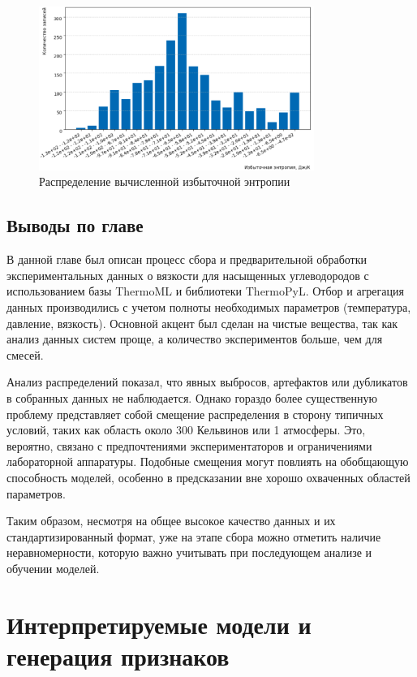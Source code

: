 \documentclass[a4paper,12pt]{article}
\begin{document}
      \begin{figure}[ht!]
          \centering
          \includegraphics[width=0.8\textwidth]{data_distribution_excess_entropy.png}
          \caption{Распределение вычисленной избыточной энтропии}
          \label{fig:data_distribution_excess_entropy}
      \end{figure}
      
  \subsection{Выводы по главе}
    В данной главе был описан процесс сбора и предварительной обработки экспериментальных данных о вязкости для насыщенных углеводородов с использованием базы ThermoML и библиотеки ThermoPyL. Отбор и агрегация данных производились с учетом полноты необходимых параметров (температура, давление, вязкость). Основной акцент был сделан на чистые вещества, так как анализ данных систем проще, а количество экспериментов больше, чем для смесей.

    Анализ распределений показал, что явных выбросов, артефактов или дубликатов в собранных данных не наблюдается. Однако гораздо более существенную проблему представляет собой смещение распределения в сторону типичных условий, таких как область около 300 Кельвинов или 1 атмосферы. Это, вероятно, связано с предпочтениями экспериментаторов и ограничениями лабораторной аппаратуры. Подобные смещения могут повлиять на обобщающую способность моделей, особенно в предсказании вне хорошо охваченных областей параметров.

    Таким образом, несмотря на общее высокое качество данных и их стандартизированный формат, уже на этапе сбора можно отметить наличие неравномерности, которую важно учитывать при последующем анализе и обучении моделей.
\newpage

\section{Интерпретируемые модели и генерация признаков}
\end{document}
